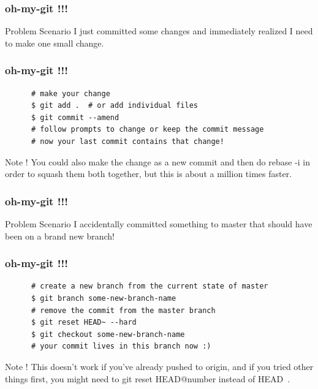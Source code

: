 \documentclass[10pt]{beamer}
\begin{document}
\begin{frame}
  \frametitle{oh-my-git !!!}
  \begin{alertblock}{Problem Scenario}
    I just committed some changes and immediately realized I need to make one small change.
  \end{alertblock}
\end{frame}

\begin{frame}[fragile]
  \frametitle{oh-my-git !!!}
  \begin{example}[Solution]
    \begin{verbatim}
      # make your change
      $ git add .  # or add individual files
      $ git commit --amend
      # follow prompts to change or keep the commit message
      # now your last commit contains that change!
    \end{verbatim}
  \end{example}
  \pause
  \begin{block}{Note !}
    You could also make the change as a new commit and then do rebase -i in order to squash them both together,
    but this is about a million times faster.
  \end{block}
\end{frame}

\begin{frame}
  \frametitle{oh-my-git !!!}
  \begin{alertblock}{Problem Scenario}
   I accidentally committed something to master that should have been on a brand new branch!
  \end{alertblock}
\end{frame}

\begin{frame}[fragile]
  \frametitle{oh-my-git !!!}
  \begin{example}[Solution]
    \begin{verbatim}
      # create a new branch from the current state of master
      $ git branch some-new-branch-name
      # remove the commit from the master branch
      $ git reset HEAD~ --hard
      $ git checkout some-new-branch-name
      # your commit lives in this branch now :)
    \end{verbatim}
  \end{example}
  \pause
  \begin{block}{Note !}
    This doesn't work if you've already pushed to origin, and if you tried other things first,
    you might need to git reset HEAD@{number} instead of HEAD~.
  \end{block}
\end{frame}
\end{document}
